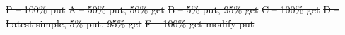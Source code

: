 \documentclass[sigplan,10pt]{acmart}
\providecommand{\DIFdel}[1]{{\protect\color{red}\sout{#1}}}                      %
\providecommand{\DIFdelFL}[1]{\DIFdel{#1}} %
\begin{document}
{%
\DIFdelFL{P -- 100\% put}}
{%
\DIFdelFL{A -- 50\% put, 50\% get}}
{%
\DIFdelFL{B -- 5\% put, 95\% get}}
{%
\DIFdelFL{C -- 100\% get}}
{%
\DIFdelFL{D -- Latest-simple, 5\% put, 95\% get}}
{%
\DIFdelFL{F -- 100\% get-modify-put}}
\end{document}
